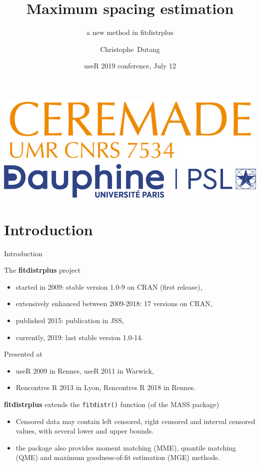 \documentclass[8pt, hide notes]{beamer}
\title %
{Maximum spacing estimation}
\subtitle{a new method in fitdistrplus}
\author[C. Dutang]{Christophe~Dutang\inst{1}} %
\institute %
{
  \inst{1}%
  CEREMADE, Universit\'e Paris Dauphine
}
\date[12/07/2019] %
{useR 2019 conference, July 12}
\newcommand{\pkg}{\textbf}
\newcommand{\sigle}{\textsc}
\newcommand{\code}{\texttt}
\begin{document}
\begin{frame}[plain]


  \includegraphics[height=.9cm]{img/ceremade} \hspace{.5cm}
  \includegraphics[height=.9cm]{img/Dauphine.jpg} 
  \vspace{.25cm}

  
  \titlepage
  
\end{frame}

\section{Introduction}

\begin{frame}{Introduction}


The \pkg{fitdistrplus} project 
\begin{itemize}
\item started in 2009: stable version 1.0-9 on \sigle{CRAN} (first release),
\item extensively enhanced between 2009-2018: 17 versions on CRAN,
\item published 2015: publication in JSS,
\item currently, 2019:  last stable version 1.0-14.
\end{itemize}

\bigskip

Presented at 
\begin{itemize}
\item useR 2009 in Rennes, useR 2011 in Warwick,
\item Rencontres R 2013 in Lyon,  Rencontres R 2018 in Rennes.
\end{itemize}

\bigskip
\pause

\pkg{fitdistrplus} extends the \code{fitdistr()} function (of the MASS package) 
\begin{itemize}
\item Censored data may contain left censored, right censored and interval censored values, with several lower and upper bounds. 
\item the package also provides moment matching (MME), quantile matching (QME) and maximum goodness-of-fit estimation (MGE) methods. 
\end{itemize}

\end{frame}
\end{document}
